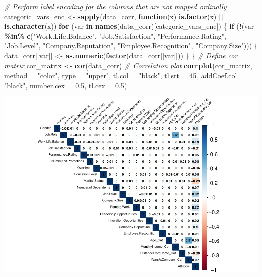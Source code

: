 \documentclass[
  10pt,
  paper=a4,
  ,captions=tableheading
]{scrartcl}
\newenvironment{Shaded}{\begin{snugshade}}{\end{snugshade}}
\newcommand{\AttributeTok}[1]{\textcolor[rgb]{0.13,0.29,0.53}{#1}}
\newcommand{\CommentTok}[1]{\textcolor[rgb]{0.56,0.35,0.01}{\textit{#1}}}
\newcommand{\ControlFlowTok}[1]{\textcolor[rgb]{0.13,0.29,0.53}{\textbf{#1}}}
\newcommand{\DecValTok}[1]{\textcolor[rgb]{0.00,0.00,0.81}{#1}}
\newcommand{\FloatTok}[1]{\textcolor[rgb]{0.00,0.00,0.81}{#1}}
\newcommand{\FunctionTok}[1]{\textcolor[rgb]{0.13,0.29,0.53}{\textbf{#1}}}
\newcommand{\NormalTok}[1]{#1}
\newcommand{\OtherTok}[1]{\textcolor[rgb]{0.56,0.35,0.01}{#1}}
\newcommand{\SpecialCharTok}[1]{\textcolor[rgb]{0.81,0.36,0.00}{\textbf{#1}}}
\newcommand{\StringTok}[1]{\textcolor[rgb]{0.31,0.60,0.02}{#1}}
\begin{document}
\begin{Shaded}
\begin{Highlighting}[]
\CommentTok{\# Perform label encoding for the columns that are not mapped ordinally}
\NormalTok{categoric\_vars\_enc }\OtherTok{\textless{}{-}} \FunctionTok{sapply}\NormalTok{(data\_corr, }\ControlFlowTok{function}\NormalTok{(x) }\FunctionTok{is.factor}\NormalTok{(x) }\SpecialCharTok{||} \FunctionTok{is.character}\NormalTok{(x))}
\ControlFlowTok{for}\NormalTok{ (var }\ControlFlowTok{in} \FunctionTok{names}\NormalTok{(data\_corr)[categoric\_vars\_enc]) \{}
    \ControlFlowTok{if}\NormalTok{ (}\SpecialCharTok{!}\NormalTok{(var }\SpecialCharTok{\%in\%} \FunctionTok{c}\NormalTok{(}\StringTok{"Work.Life.Balance"}\NormalTok{, }\StringTok{"Job.Satisfaction"}\NormalTok{, }\StringTok{"Performance.Rating"}\NormalTok{,}
        \StringTok{"Job.Level"}\NormalTok{, }\StringTok{"Company.Reputation"}\NormalTok{, }\StringTok{"Employee.Recognition"}\NormalTok{, }\StringTok{"Company.Size"}\NormalTok{))) \{}
\NormalTok{        data\_corr[[var]] }\OtherTok{\textless{}{-}} \FunctionTok{as.numeric}\NormalTok{(}\FunctionTok{factor}\NormalTok{(data\_corr[[var]]))}
\NormalTok{    \}}
\NormalTok{\}}
\CommentTok{\# Define cor matrix}
\NormalTok{cor\_matrix }\OtherTok{\textless{}{-}} \FunctionTok{cor}\NormalTok{(data\_corr)}
\CommentTok{\# Correlation plot}
\FunctionTok{corrplot}\NormalTok{(cor\_matrix, }\AttributeTok{method =} \StringTok{"color"}\NormalTok{, }\AttributeTok{type =} \StringTok{"upper"}\NormalTok{, }\AttributeTok{tl.col =} \StringTok{"black"}\NormalTok{,}
    \AttributeTok{tl.srt =} \DecValTok{45}\NormalTok{, }\AttributeTok{addCoef.col =} \StringTok{"black"}\NormalTok{, }\AttributeTok{number.cex =} \FloatTok{0.5}\NormalTok{, }\AttributeTok{tl.cex =} \FloatTok{0.5}\NormalTok{)}
\end{Highlighting}
\end{Shaded}

\includegraphics[width=0.8\linewidth]{figs/data_corr-1}
\end{document}
